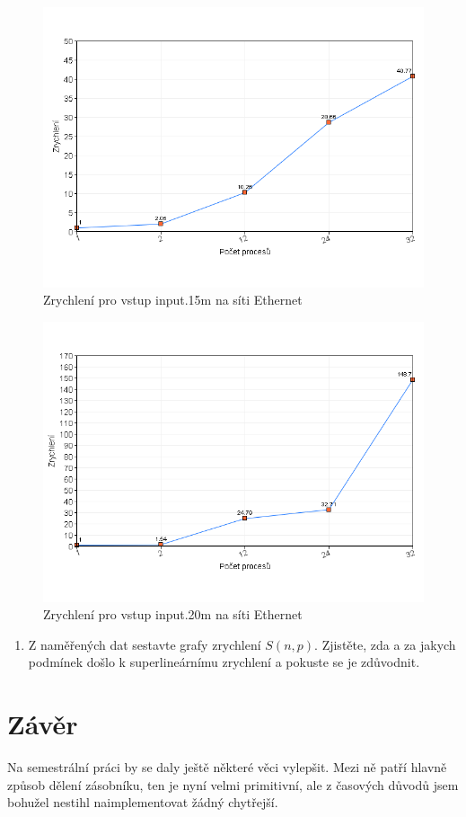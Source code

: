 \documentclass[12pt]{article}
\begin{document}
\begin{figure}[ht]
\begin{center}
\includegraphics[width=15cm]{input_15m_ethernet}
\end{center}
\caption{Zrychlení pro vstup input.15m na síti Ethernet}
\end{figure}

\begin{figure}[ht]
\begin{center}
\includegraphics[width=15cm]{input_20m_ethernet}
\end{center}
\caption{Zrychlení pro vstup input.20m na síti Ethernet}
\end{figure}

\begin{enumerate}


\item Z naměřených dat sestavte grafy zrychlení $S(n,p)$. Zjistěte, zda a za jakych podmínek
došlo k superlineárnímu zrychlení a pokuste se je zdůvodnit.

\end{enumerate}

\section{Závěr}

Na semestrální práci by se daly ještě některé věci vylepšit. Mezi ně patří hlavně způsob dělení zásobníku, ten je nyní velmi primitivní, ale z časových důvodů jsem bohužel nestihl naimplementovat žádný chytřejší.
\end{document}
